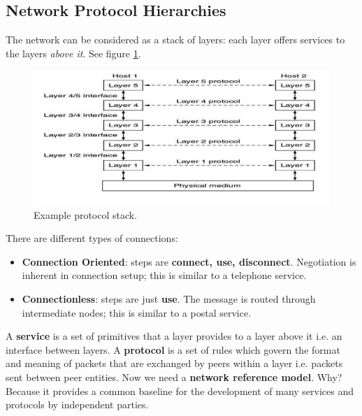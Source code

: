\documentclass[twoside]{article}
\begin{document}
\subsection{Network Protocol Hierarchies}
The network can be considered as a stack of layers: each layer offers services
to the layers \emph{above it}. See figure \ref{fig:protocol-stack}.
\begin{figure}
  \includegraphics[width=\linewidth]{protocol-stack.png}
  \caption{Example protocol stack.}
  \label{fig:protocol-stack}
\end{figure}
There are different types of connections:
\begin{itemize}
    \item \textbf{Connection Oriented}: steps are \textbf{connect, use, disconnect}.
    Negotiation is inherent in connection setup; this is similar to a 
    telephone service.
    \item \textbf{Connectionless}: steps are just \textbf{use}. The message is routed 
    through intermediate nodes; this is similar to a postal service.
\end{itemize}
A \textbf{service} is a set of primitives that a layer provides to a layer above
it i.e. an interface between layers. A \textbf{protocol} is a set of rules
which govern the format and meaning of packets that are exchanged by peers 
within a layer i.e. packets sent between peer entities. Now we need a 
\textbf{network reference model}. Why? Because it provides a common baseline
for the development of many services and protocols by independent parties.
\end{document}
